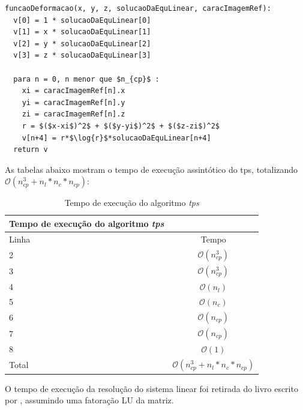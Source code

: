 \begin{lstlisting}[mathescape]
funcaoDeformacao(x, y, z, solucaoDaEquLinear, caracImagemRef):
  v[0] = 1 * solucaoDaEquLinear[0]
  v[1] = x * solucaoDaEquLinear[1]
  v[2] = y * solucaoDaEquLinear[2]
  v[3] = z * solucaoDaEquLinear[3]

  para n = 0, n menor que $n_{cp}$ :
    xi = caracImagemRef[n].x
    yi = caracImagemRef[n].y
    zi = caracImagemRef[n].z
    r = $($x-xi$)^2$ + $($y-yi$)^2$ + $($z-zi$)^2$
    v[n+4] = r*$\log{r}$*solucaoDaEquLinear[n+4]
  return v
\end{lstlisting}

  As tabelas abaixo mostram o tempo de execução assintótico do tps, totalizando
$\mathcal{O}(n_{cp}^3+n_l*n_c*n_{cp})$:

\begin{table}[H]
\begin{center}
\begin{tabular}{l|c}
\hline
Tempo de execução do algoritmo \textit{tps} \\
\hline
Linha&Tempo\\
\hline
2       &$\mathcal{O}(n_{cp}^3)$\\
3       &$\mathcal{O}(n_{cp}^3)$\\
4       &$\mathcal{O}(n_l)$\\
5       &$\mathcal{O}(n_c)$\\
6       &$\mathcal{O}(n_{cp})$\\
7       &$\mathcal{O}(n_{cp})$\\
8       &$\mathcal{O}(1)$\\
\hline
Total   &$\mathcal{O}(n_{cp}^3+n_l*n_c*n_{cp})$\\
\hline
\end{tabular}
\caption{Tempo de execução do algoritmo \textit{tps}}
\label{table:tps}
\end{center}
\end{table}

  O tempo de execução da resolução do sistema linear foi retirada do livro escrito por
\cite[Part~IV]{trefethen1997numerical}, assumindo uma fatoração LU da matriz.

